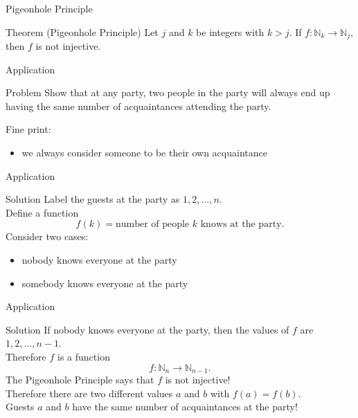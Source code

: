 \documentclass{beamer}
\begin{document}
\begin{frame}{Pigeonhole Principle}
\begin{block}{Theorem (Pigeonhole Principle)}
Let $j$ and $k$ be integers with $k > j$.
If $f: \mathbb N_k\rightarrow\mathbb N_j$, then $f$ is not injective.
\end{block}
\end{frame}

\begin{frame}{Application}
\begin{block}{Problem}
Show that at any party, two people in the party will always end up having the same number of acquaintances attending the party.
\end{block}
\pause
Fine print:
\begin{itemize}
\pause
\item we always consider someone to be their own acquaintance
\end{itemize}
\end{frame}

\begin{frame}{Application}
\begin{block}{Solution}
\pause
Label the guests at the party as $1,2,\dots,n$.\\
\pause
Define a function
$$f(k) = \text{number of people $k$ knows at the party}.$$
\pause
Consider two cases:
\begin{itemize}
\pause
\item nobody knows everyone at the party
\pause
\item somebody knows everyone at the party
\end{itemize}
\end{block}
\end{frame}

\begin{frame}{Application}
\pause
\begin{block}{Solution}
\pause
If nobody knows everyone at the party, then the values of $f$ are $1,2,\dots, n-1$.\\
\pause
Therefore $f$ is a function
$$f: \mathbb N_n\rightarrow\mathbb N_{n-1}.$$
\pause
The Pigeonhole Principle says that $f$ is not injective!\\
\pause
Therefore there are two different values $a$ and $b$ with $f(a) = f(b)$.\\
\pause
Guests $a$ and $b$ have the same number of acquaintances at the party!
\end{block}
\end{frame}
\end{document}
